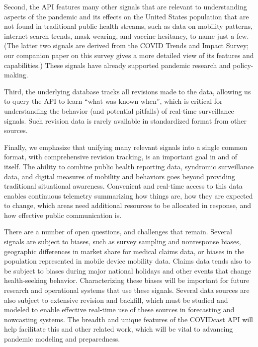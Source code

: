 \documentclass[9pt,twocolumn,twoside,lineno]{pnas-new}
\begin{document}
Second, the API features many other signals that are relevant to understanding
aspects of the pandemic and its effects on the United States population that are
not found in traditional public health streams, such as data on mobility
patterns, internet search trends, mask wearing, and vaccine hesitancy, to name
just a few. (The latter two signals are derived from the COVID Trends and Impact
Survey; our companion paper on this survey gives a more detailed view of its
features and capabilities.) These signals have already supported pandemic
research and  policy-making.

Third, the underlying database tracks all revisions made to the data, allowing
us to query the API to learn ``what was known when'', which is critical for
understanding the behavior (and potential pitfalls) of real-time surveillance
signals. Such revision data is rarely available in standardized format from
other sources.

Finally, we emphasize that unifying many relevant signals into a single common
format, with comprehensive revision tracking, is an important goal in and of 
itself. The ability to combine public health reporting data, syndromic
surveillance data, and digital measures of mobility and behaviors goes beyond
providing traditional situational awareness.  Convenient and real-time access to
this data enables continuous telemetry summarizing how things are, how they are
expected to change, which areas need additional resources to be allocated in
response, and how effective public communication is. 

There are a number of open questions, and challenges that remain. Several
signals are subject to biases, such as survey sampling and nonresponse biases,
geographic differences in market share for medical claims data, or biases in the
population represented in mobile device mobility data.
Claims data tends also to be subject to biases during major national holidays
and other events that change health-seeking behavior. Characterizing these
biases will be important for future research and operational systems that use
these signals.  Several data sources are also subject to extensive revision and
backfill, which must be studied and modeled to enable effective real-time use of
these sources in forecasting and nowcasting systems. The breadth and unique
features of the COVIDcast API will help facilitate this and other related work,
which will be vital to advancing pandemic modeling and preparedness.


\showacknow{} %


\end{document}
